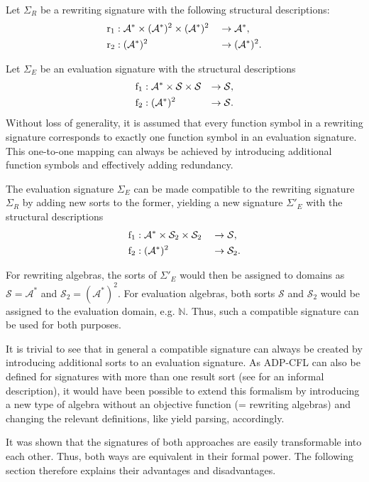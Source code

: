 \documentclass[
    a4paper,
    12pt,
    twoside,
    BCOR=12mm,
    parskip=half,
    chapterprefix,
    numbers=noenddot,
    bibliography=totoc
]{scrbook}
\begin{document}
Let $\Sigma_R$ be a rewriting signature with the following structural descriptions:
\begin{align*}
	\mathrm{r}_1&: \mathcal{A}^* \times (\mathcal{A}^*)^2 \times (\mathcal{A}^*)^2 &&\to \mathcal{A}^*,\\
	\mathrm{r}_2&: (\mathcal{A}^*)^2 &&\to (\mathcal{A}^*)^2.
\end{align*}

Let $\Sigma_E$ be an evaluation signature with the structural descriptions
\begin{align*}
	\mathrm{f}_1&: \mathcal{A}^* \times \mathcal{S} \times \mathcal{S} &\to \mathcal{S},\\
	\mathrm{f}_2&: (\mathcal{A}^*)^2 &\to \mathcal{S}.
\end{align*}
Without loss of generality, it is assumed that every function symbol in a rewriting signature corresponds to exactly one function symbol in an evaluation signature. This one-to-one mapping can always be achieved by introducing additional function symbols and effectively adding redundancy.

The evaluation signature $\Sigma_E$ can be made compatible to the rewriting signature $\Sigma_R$ by adding new sorts to the former, yielding a new signature $\Sigma'_E$ with the structural descriptions
\begin{align*}
	\mathrm{f}_1&: \mathcal{A}^* \times \mathcal{S}_2 \times \mathcal{S}_2 &&\to \mathcal{S},\\
	\mathrm{f}_2&: (\mathcal{A}^*)^2 &&\to \mathcal{S}_2.
\end{align*}

For rewriting algebras, the sorts of $\Sigma'_E$ would then be assigned to domains as $\mathcal{S}=\mathcal{A}^*$ and $\mathcal{S}_2=(\mathcal{A}^*)^2$. For evaluation algebras, both sorts $\mathcal{S}$ and $\mathcal{S}_2$ would be assigned to the evaluation domain, e.g. $\mathbb{N}$. Thus, such a compatible signature can be used for both purposes.

It is trivial to see that in general a compatible signature can always be created by introducing additional sorts to an evaluation signature. As \gls{ADP-CFL} can also be defined for signatures with more than one result sort (see \citet{sauthoff_bellmans_2011-1} for an informal description), it would have been possible to extend this formalism by introducing a new type of algebra without an objective function (= rewriting algebras) and changing the relevant definitions, like yield parsing, accordingly.

It was shown that the signatures of both approaches are easily transformable into each other. Thus, both ways are equivalent in their formal power. The following section therefore explains their advantages and disadvantages.
\end{document}
